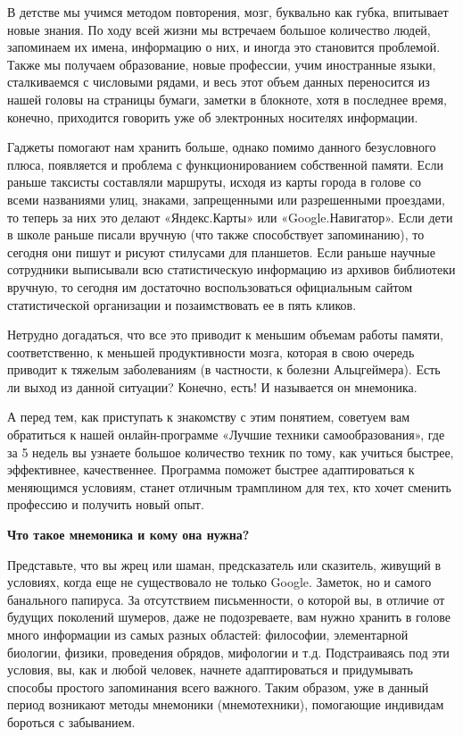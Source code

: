 В детстве мы учимся методом повторения, мозг, буквально как губка, впитывает новые знания. По ходу всей жизни мы встречаем большое количество людей, запоминаем их имена, информацию о них, и иногда это становится проблемой. Также мы получаем образование, новые профессии, учим иностранные языки, сталкиваемся с числовыми рядами, и весь этот объем данных переносится из нашей головы на страницы бумаги, заметки в блокноте, хотя в последнее время, конечно, приходится говорить уже об электронных носителях информации.

Гаджеты помогают нам хранить больше, однако помимо данного безусловного плюса, появляется и проблема с функционированием собственной памяти. Если раньше таксисты составляли маршруты, исходя из карты города в голове со всеми названиями улиц, знаками, запрещенными или разрешенными проездами, то теперь за них это делают «Яндекс.Карты» или «Google.Навигатор». Если дети в школе раньше писали вручную (что также способствует запоминанию), то сегодня они пишут и рисуют стилусами для планшетов. Если раньше научные сотрудники выписывали всю статистическую информацию из архивов библиотеки вручную, то сегодня им достаточно воспользоваться официальным сайтом статистической организации и позаимствовать ее в пять кликов.

Нетрудно догадаться, что все это приводит к меньшим объемам работы памяти, соответственно, к меньшей продуктивности мозга, которая в свою очередь приводит к тяжелым заболеваниям (в частности, к болезни Альцгеймера). Есть ли выход из данной ситуации? Конечно, есть! И называется он мнемоника.

А перед тем, как приступать к знакомству с этим понятием, советуем вам обратиться к нашей онлайн-программе «Лучшие техники самообразования», где за 5 недель вы узнаете большое количество техник по тому, как учиться быстрее, эффективнее, качественнее. Программа поможет быстрее адаптироваться к меняющимся условиям, станет отличным трамплином для тех, кто хочет сменить профессию и получить новый опыт.

\textbf{Что такое мнемоника и кому она нужна?}

Представьте, что вы жрец или шаман, предсказатель или сказитель, живущий в условиях, когда еще не существовало не только Google.
Заметок, но и самого банального папируса. За отсутствием письменности, о которой вы, в отличие от будущих поколений шумеров, даже не подозреваете, вам нужно хранить в голове много информации из самых разных областей:  философии, элементарной биологии, физики, проведения обрядов, мифологии и т.д.
Подстраиваясь под эти условия, вы, как и любой человек, начнете адаптироваться и придумывать способы простого запоминания всего важного. Таким образом, уже в данный период возникают методы мнемоники (мнемотехники), помогающие индивидам бороться с забыванием.

